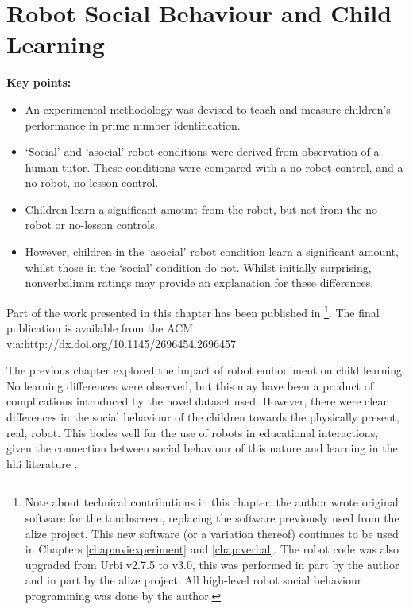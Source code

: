 \chapter{Robot Social Behaviour and Child Learning} \label{chap:socasoc}

\begin{framed}
	\textbf{Key points:}
	
	\begin{itemize}
	\item An experimental methodology was devised to teach and measure children's performance in prime number identification.
	\item `Social' and `asocial' robot conditions were derived from observation of a human tutor. These conditions were compared with a no-robot control, and a no-robot, no-lesson control.
	\item Children learn a significant amount from the robot, but not from the no-robot or no-lesson controls.
	\item However, children in the `asocial' robot condition learn a significant amount, whilst those in the `social' condition do not. Whilst initially surprising, \gls{nonverbalimm} ratings may provide an explanation for these differences.
	\end{itemize}
\end{framed}

Part of the work presented in this chapter has been published in \cite{kennedy2015robot}
\footnote{Note about technical contributions in this chapter: the author wrote original software for the touchscreen, replacing the software previously used from the \acrshort{alize} project. This new software (or a variation thereof) continues to be used in Chapters \ref{chap:nviexperiment} and \ref{chap:verbal}. The robot code was also upgraded from Urbi v2.7.5 to v3.0, this was performed in part by the author and in part by the \acrshort{alize} project. All high-level robot social behaviour programming was done by the author.}. The final publication is available from the ACM via:\newline http://dx.doi.org/10.1145/2696454.2696457


\newpage
The previous chapter explored the impact of robot embodiment on child \gls{learning}. No learning differences were observed, but this may have been a product of complications introduced by the novel dataset used. However, there were clear differences in the social behaviour of the children towards the physically present, real, robot. This bodes well for the use of robots in educational interactions, given the connection between social behaviour of this nature and \gls{learning} in the \acrshort{hhi} literature \citep{richmond2003development}.

